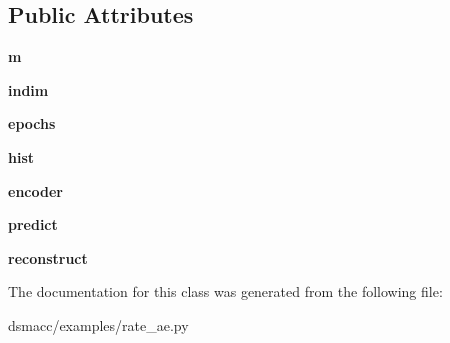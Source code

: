 \subsection*{Public Attributes}
\begin{DoxyCompactItemize}
\item 
\mbox{\label{classdsmacc_1_1examples_1_1rate__ae_1_1rateae_a9417144e6ca1c6983bfd64bc5002c05e}} 
{\bfseries m}
\item 
\mbox{\label{classdsmacc_1_1examples_1_1rate__ae_1_1rateae_ab779b1716f2b82c041175bcbdde82656}} 
{\bfseries indim}
\item 
\mbox{\label{classdsmacc_1_1examples_1_1rate__ae_1_1rateae_a5bc6d0f2ad560a0ac15ce4afc7920250}} 
{\bfseries epochs}
\item 
\mbox{\label{classdsmacc_1_1examples_1_1rate__ae_1_1rateae_af5bb66560659e63ecf58568549b0833f}} 
{\bfseries hist}
\item 
\mbox{\label{classdsmacc_1_1examples_1_1rate__ae_1_1rateae_ad35d5d05995b983e52e1d92d386292e7}} 
{\bfseries encoder}
\item 
\mbox{\label{classdsmacc_1_1examples_1_1rate__ae_1_1rateae_a93d0c593a3f4651d2e458699a7e01cba}} 
{\bfseries predict}
\item 
\mbox{\label{classdsmacc_1_1examples_1_1rate__ae_1_1rateae_a14bc7ab91cdb455b1fd4c602af5bd9e6}} 
{\bfseries reconstruct}
\end{DoxyCompactItemize}


The documentation for this class was generated from the following file\+:\begin{DoxyCompactItemize}
\item 
dsmacc/examples/rate\+\_\+ae.\+py\end{DoxyCompactItemize}
